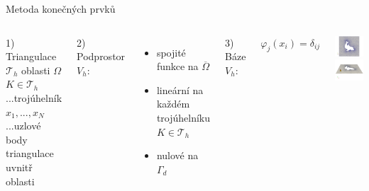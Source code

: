 \documentclass{beamer}
\newcommand{\Th}{\mathcal T_h}
\begin{document}
\begin{frame}{Metoda konečných prvků}

\begin{columns}
\column{6cm}
1) Triangulace $\Th$ oblasti $\Omega$\\
$K\in \Th$...trojúhelník\\
$x_1,..., x_N$...uzlové body triangulace uvnitř oblasti
\vspace{1cm}

2) Podprostor $V_h$:

\begin{itemize}
\item spojité funkce na $\overline\Omega$
\item lineární na každém trojúhelníku $K\in \Th$
\item nulové na $\Gamma_d$
\end{itemize}
\vspace{1cm}

3) Báze $V_h$:

$\varphi_j(x_i) = \delta_{ij}$

\column{6cm}
\includegraphics[width=6cm]{mesh}\\
\includegraphics[width=6cm]{base}
\end{columns}

\end{frame}
\end{document}
